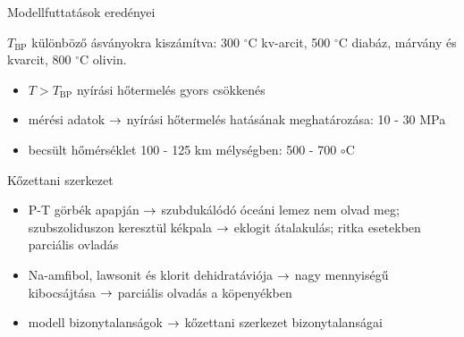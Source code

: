 \documentclass{beamer}
\begin{document}
\begin{frame}{Modellfuttatások eredényei}
    \begin{minipage}[c]{0.65\textwidth}
        \centering

    $T_{\text{BP}}$ különböző ásványokra kiszámítva: 300 $^\circ$C kv-arcit, 500 $^\circ$C diabáz, márvány és kvarcit, 800 $^\circ$C olivin.
    \end{minipage}
    \hspace{5pt}
    \begin{minipage}[c]{0.3\textwidth}
        \begin{itemize}
            \item $ T > T_{\text{BP}}$ nyírási hőtermelés gyors csökkenés
            \item mérési adatok $\rightarrow$ nyírási hőtermelés hatásának meghatározása: 10 - 30 MPa
            \item becsült hőmérséklet 100 - 125 km mélységben: 500 - 700 $\circ$C
        \end{itemize}
    \end{minipage}
\end{frame}


\begin{frame}{Kőzettani szerkezet}
    \begin{minipage}[c]{0.45\textwidth}
        \centering
    \end{minipage}
    \hspace{5pt}
    \begin{minipage}[c]{0.45\textwidth}
        \begin{itemize}
            \item P-T görbék apapján $\rightarrow$ szubdukálódó óceáni lemez nem olvad meg; szubszoliduszon keresztül kékpala $\rightarrow$ eklogit átalakulás; ritka esetekben parciális ovladás
            \item Na-amfibol, lawsonit és klorit dehidratáviója $\rightarrow$ nagy mennyiségű  kibocsájtása $\rightarrow$ parciális olvadás a köpenyékben
            \item modell bizonytalanságok $\rightarrow$ kőzettani szerkezet bizonytalanságai
        \end{itemize}
    \end{minipage}
\end{frame}
\end{document}
